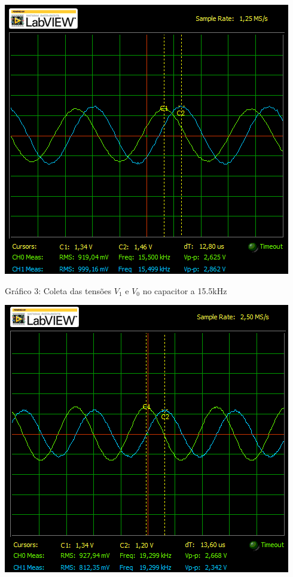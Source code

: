 \documentclass[a4 paper]{article}
\begin{document}
\newpage
\begin{table}[h]
\centering
\includegraphics[scale=0.7]{graficos/circ1/rgadicoa1-2-15_5}
\end{table}

\begin{center}
Gráfico 3: Coleta das tensões $V_1$ e $V_0$ no capacitor a 15.5kHz
\end{center}


\begin{table}[h]
\centering
\includegraphics[scale=0.7]{graficos/circ1/rgadicoa1-2-19_3}
\end{table}
\end{document}

